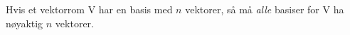 Hvis et vektorrom V har en basis med $n$ vektorer,
så må \emph{alle} basiser for V ha nøyaktig $n$ vektorer.
